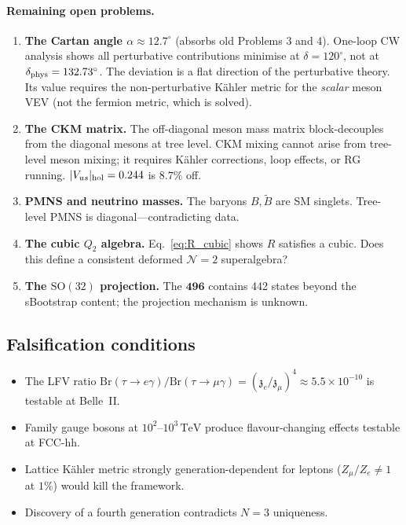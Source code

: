 \documentclass[12pt,a4paper]{article}
\newcommand{\SO}{\mathrm{SO}}
\newcommand{\TeV}{\,\mathrm{TeV}}
\newcommand{\zch}{\mathfrak{z}}
\begin{document}
\paragraph{Remaining open problems.}
\begin{enumerate}
\item \textbf{The Cartan angle $\alpha \approx 12.7^\circ$}
  (absorbs old Problems 3 and 4).
  One-loop CW analysis shows all perturbative contributions
  minimise at $\delta = 120^\circ$, not at
  $\delta_{\rm phys} = 132.73^\circ$.
  The deviation is a flat direction of the perturbative theory.
  Its value requires the non-perturbative K\"ahler metric for
  the \emph{scalar} meson VEV (not the fermion metric, which is
  solved).

\item \textbf{The CKM matrix.}
  The off-diagonal meson mass matrix block-decouples from the
  diagonal mesons at tree level.
  CKM mixing cannot arise from tree-level meson mixing;
  it requires K\"ahler corrections, loop effects, or RG running.
  $|V_{us}|_{\rm hol} = 0.244$ is $8.7\%$ off.

\item \textbf{PMNS and neutrino masses.}
  The baryons $B, \tilde{B}$ are SM singlets.
  Tree-level PMNS is diagonal---contradicting data.

\item \textbf{The cubic $Q_2$ algebra.}
  Eq.~\eqref{eq:R_cubic} shows $R$ satisfies a cubic.
  Does this define a consistent deformed $\mathcal{N}{=}2$
  superalgebra?

\item \textbf{The $\SO(32)$ projection.}
  The $\mathbf{496}$ contains 442 states beyond the sBootstrap
  content; the projection mechanism is unknown.
\end{enumerate}


\subsection{Falsification conditions}

\begin{itemize}
  \item The LFV ratio
    $\mathrm{Br}(\tau \to e\gamma)/\mathrm{Br}(\tau \to \mu\gamma)
    = (\zch_e/\zch_\mu)^4 \approx 5.5 \times 10^{-10}$ is
    testable at Belle~II.
  \item Family gauge bosons at $10^2$--$10^3\TeV$ produce
    flavour-changing effects testable at FCC-hh.
  \item Lattice K\"ahler metric strongly generation-dependent
    for leptons ($Z_\mu/Z_e \neq 1$ at $1\%$) would kill the
    framework.
  \item Discovery of a fourth generation contradicts $N = 3$
    uniqueness.
\end{itemize}
\end{document}
